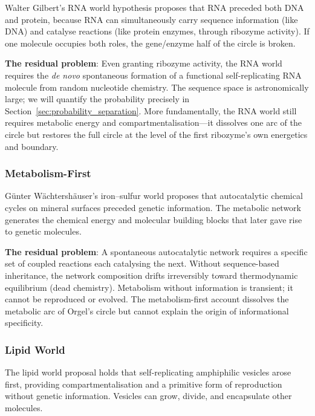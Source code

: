 Walter Gilbert's RNA world hypothesis \citep{gilbert1986} proposes that RNA
preceded both DNA and protein, because RNA can simultaneously carry sequence
information (like DNA) and catalyse reactions (like protein enzymes, through
ribozyme activity). If one molecule occupies both roles, the gene/enzyme
half of the circle is broken.

\textbf{The residual problem}: Even granting ribozyme activity, the RNA world
requires the \emph{de novo} spontaneous formation of a functional self-replicating
RNA molecule from random nucleotide chemistry. The sequence space is astronomically
large; we will quantify the probability precisely in Section~\ref{sec:probability_separation}.
More fundamentally, the RNA world still requires metabolic energy and
compartmentalisation---it dissolves one arc of the circle but restores the
full circle at the level of the first ribozyme's own energetics and boundary.

\subsubsection{Metabolism-First}

G\"{u}nter W\"{a}chtersh\"{a}user's iron--sulfur world \citep{wachtershauser1988}
proposes that autocatalytic chemical cycles on mineral surfaces preceded genetic
information. The metabolic network generates the chemical energy and molecular
building blocks that later gave rise to genetic molecules.

\textbf{The residual problem}: A spontaneous autocatalytic network requires a
specific set of coupled reactions each catalysing the next. Without sequence-based
inheritance, the network composition drifts irreversibly toward thermodynamic
equilibrium (dead chemistry). Metabolism without information is transient; it
cannot be reproduced or evolved. The metabolism-first account dissolves the
metabolic arc of Orgel's circle but cannot explain the origin of informational
specificity.

\subsubsection{Lipid World}

The lipid world proposal \citep{segre2001} holds that self-replicating
amphiphilic vesicles arose first, providing compartmentalisation and a primitive
form of reproduction without genetic information. Vesicles can grow, divide, and
encapsulate other molecules.

